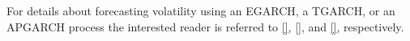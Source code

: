 For details about forecasting volatility using an EGARCH, a TGARCH, or an APGARCH process the interested reader is referred to \ref{}, \ref{}, and \ref{}, respectively. %




